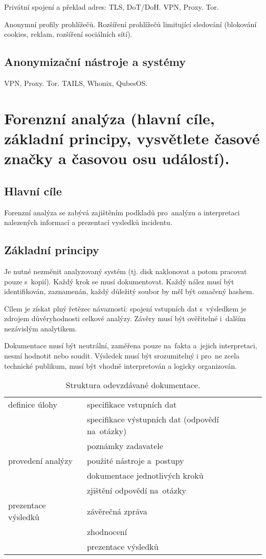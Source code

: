 Privátní spojení a překlad adres: TLS, DoT/DoH.
VPN, Proxy.
Tor.

Anonymní profily prohlížečů.
Rozšíření prohlížečů limitující sledování (blokování cookies, reklam, rozšíření sociálních sítí).


\subsection{Anonymizační nástroje a systémy}

VPN, Proxy.
Tor.
TAILS, Whonix, QubesOS.


\clearpage
\section{Forenzní analýza (hlavní cíle, základní principy, vysvětlete časové značky a časovou osu událostí).}
\subsection{Hlavní cíle}

Forenzní analýza se zabývá zajištěním podkladů pro~analýzu a interpretaci nalezených informací a prezentací vysledků incidentu.


\subsection{Základní principy}

Je nutné nezměnit analyzovaný systém (tj. disk naklonovat a potom pracovat pouze s~kopií).
Každý krok se musí dokumentovat.
Každý nález musí být identifikován, zaznamenán, každý důležitý soubor by měl být označený hashem.

Cílem je získat plný řetězec návazností: spojení vstupních dat s~výsledkem je zdrojem důvěryhodnosti celkové analýzy.
Závěry musí být ověřitelné i~dalším nezávislým analytikem.

Dokumentace musí být neutrální, zaměřena pouze na~fakta a~jejich interpretaci, nesmí hodnotit nebo soudit.
Výsledek musí být srozumitelný i pro~ne zcela technické publikum, musí být vhodně interpretován a logicky organizován.

\begin{table}[ht]
\centering
\onehalfspacing
\begin{tabular}{ll}
definice úlohy
& specifikace vstupních dat \\
& specifikace výstupních dat (odpovědí na~otázky) \\
& poznámky zadavatele \\
\hline
provedení analýzy
& použité nástroje a~postupy \\
& dokumentace jednotlivých kroků \\
& zjištění odpovědí na~otázky \\
\hline
prezentace výsledků
& závěrečná zpráva \\
& zhodnocení \\
& prezentace výsledků \\
\end{tabular}
\caption{Struktura odevzdávané dokumentace.}
\end{table}
\FloatBarrier


